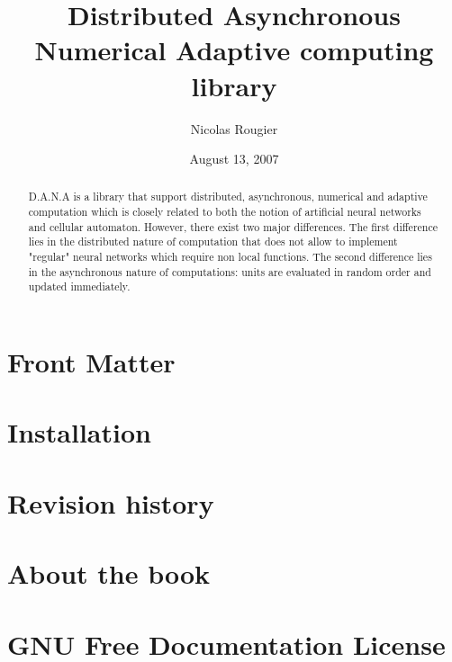 \documentclass{manual}
\title{Distributed Asynchronous Numerical Adaptive computing library}
\author{Nicolas Rougier}
\date{August 13, 2007}
\begin{document}
\maketitle

\ifhtml
\chapter*{Front Matter\label{front}}
\fi



\begin{abstract}
\noindent
D.A.N.A is a library that support distributed, asynchronous, numerical and
adaptive computation which is closely related to both the notion of artificial
neural networks and cellular automaton. However, there exist two major
differences. The first difference lies in the distributed nature of computation
that does not allow to implement "regular" neural networks which require non
local functions. The second difference lies in the asynchronous nature of
computations: units are evaluated in random order and updated immediately.
\end{abstract}

\tableofcontents



\chapter{Installation}



\appendix

\chapter{Revision history}


\chapter{About the book}


\chapter{GNU Free Documentation License \label{License}}



%
%
%

\end{document}
